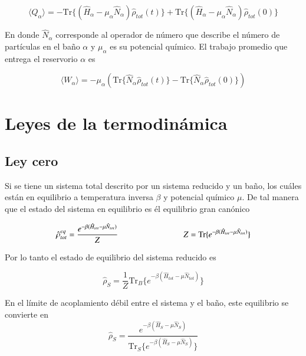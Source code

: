 \begin{equation*}
    \langle Q_{\alpha}\rangle = - \text{Tr}\{(\hat{H}_{\alpha} - \mu_{\alpha}\hat{N}_{\alpha})\hat{\rho}_{tot}(t) \} + \text{Tr}\{(\hat{H}_{\alpha} - \mu_{\alpha}\hat{N}_{\alpha})\hat{\rho}_{tot}(0) \}
\end{equation*}

En donde $\hat{N}_{\alpha}$ corresponde al operador de número que describe el número de partículas en el baño $\alpha$ y $\mu_{\alpha}$ es su potencial químico. El trabajo promedio que entrega el reservorio $\alpha$ es

\begin{equation*}
    \langle W_{\alpha}\rangle = - \mu_{\alpha} (\text{Tr}\{\hat{N}_{\alpha} \hat{\rho}_{tot}(t) \} - \text{Tr}\{\hat{N}_{\alpha}\hat{\rho}_{tot}(0) \}  )
\end{equation*}
\label{sec3workheat}

\newpage

\section{Leyes de la termodinámica}
\label{Leyestermo}
\subsection{Ley cero}
Si se tiene un sistema total descrito por un sistema reducido y un baño, los cuáles están en equilibrio a temperatura inversa $\beta$ y potencial químico $\mu$. De tal manera que el estado del sistema en equilibrio es él equilibrio gran canónico

\begin{equation*}
    \hat{\rho}^{eq}_{tot} = \frac{e^{-\beta(\hat{H}_{tot} - \mu \hat{N}_{tot})}}{Z}  \hspace{28mm} Z = \text{Tr}\{e^{-\beta(\hat{H}_{tot} - \mu \hat{N}_{tot})} \}
\end{equation*}

Por lo tanto el estado de equilibrio del sistema reducido es

\begin{equation*}
    \hat{\rho}_{S} = \frac{1}{Z}\text{Tr}_{B}\{ e^{-\beta(\hat{H}_{tot} - \mu \hat{N}_{tot})} \}
\end{equation*}

En el límite de acoplamiento débil entre el sistema y el baño, este equilibrio se convierte en \cite{geva2000second}
\begin{equation*}
    \hat{\rho}_{S} = \frac{e^{-\beta(\hat{H}_{S} - \mu\hat{N}_{S})}}{\text{Tr}_{S}\{e^{-\beta(\hat{H}_{S} - \mu \hat{N}_{S})} \} }
\end{equation*}

